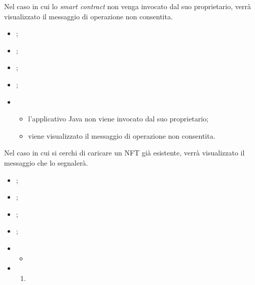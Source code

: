 \label{UC:extension.operation-not-allowed}

Nel caso in cui lo \textit{smart contract} non venga invocato dal suo proprietario, verrà visualizzato il messaggio di operazione non consentita.

\begin{itemize}
  \item {};
  \item {};
  \item {};
  \item {};
  
  \item \UCMain
  \begin{itemize}
    \item l'applicativo Java non viene invocato dal suo proprietario;
    \item viene visualizzato il messaggio di operazione non consentita. 
  \end{itemize}
\end{itemize}

\label{UC:extension.nft-exists-yet}

Nel caso in cui si cerchi di caricare un NFT già esistente, verrà visualizzato il messaggio che lo segnalerà.

\begin{itemize}
  \item {};
  \item {};
  \item {};
  \item \UCPost{};
  
  \item \UCMain
  \begin{itemize}
    \item 
  \end{itemize}
  
  \item \UCExt
  \begin{enumerate}[label=\lett]
    \item 
  \end{enumerate}
\end{itemize}


